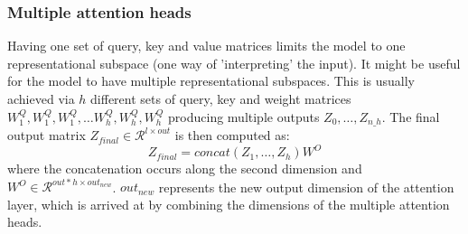 \subsubsection{Multiple attention heads} \label{subsubsec:heads}
Having one set of query, key and value matrices limits the model to one representational subspace (one way of 'interpreting' the input). It might be useful for the model to have multiple representational subspaces. This is usually achieved via $h$ different sets of query, key and weight matrices $W^Q_1, W^Q_1, W^Q_1, \dots W^Q_{h}, W^Q_{h},W^Q_{h}$ producing multiple outputs $Z_0, \dots, Z_{n\_h}$.
The final output matrix $Z_{final} \in \mathcal{R}^{l \times out}$ is then computed as:
$$Z_{final} = concat(Z_1, \dots, Z_{h}) W^O$$
where the concatenation occurs along the second dimension and $W^O \in \mathcal{R}^{out * h \times out_{new}}$. $out_{new}$ represents the new output dimension of the attention layer, which is arrived at by combining the dimensions of the multiple attention heads.

